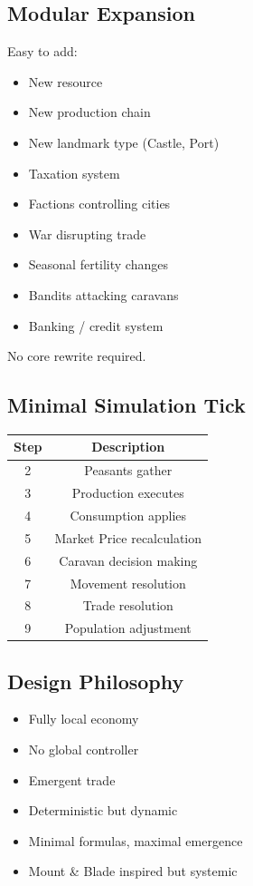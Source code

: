 \documentclass[a4paper,12pt]{article}
\begin{document}
\subsection{Modular Expansion}

Easy to add:

\begin{itemize}
\item New resource
\item New production chain
\item New landmark type (Castle, Port)
\item Taxation system
\item Factions controlling cities
\item War disrupting trade
\item Seasonal fertility changes
\item Bandits attacking caravans
\item Banking / credit system
\end{itemize}

No core rewrite required.



\subsection{Minimal Simulation Tick}

\begin{table}[H]
\centering
\begin{tabular}{|c|c|}
\hline
Step & Description \\
\hline
2 & Peasants gather \\
3 & Production executes \\
4 & Consumption applies \\
5 & Market Price recalculation \\
6 & Caravan decision making \\
7 & Movement resolution \\
8 & Trade resolution \\
9 & Population adjustment \\
\hline
\end{tabular}
\end{table}



\subsection{Design Philosophy}

\begin{itemize}
\item Fully local economy
\item No global controller
\item Emergent trade
\item Deterministic but dynamic
\item Minimal formulas, maximal emergence
\item Mount \& Blade inspired but systemic
\end{itemize}
\end{document}

